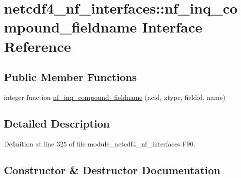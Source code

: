 \hypertarget{interfacenetcdf4__nf__interfaces_1_1nf__inq__compound__fieldname}{}\section{netcdf4\+\_\+nf\+\_\+interfaces\+:\+:nf\+\_\+inq\+\_\+compound\+\_\+fieldname Interface Reference}
\label{interfacenetcdf4__nf__interfaces_1_1nf__inq__compound__fieldname}
\subsection*{Public Member Functions}
\begin{DoxyCompactItemize}
\item 
integer function \hyperlink{interfacenetcdf4__nf__interfaces_1_1nf__inq__compound__fieldname_ae374ea1776beccf5c533842f9eb09b73}{nf\+\_\+inq\+\_\+compound\+\_\+fieldname} (ncid, xtype, fieldid, name)
\end{DoxyCompactItemize}


\subsection{Detailed Description}


Definition at line 325 of file module\+\_\+netcdf4\+\_\+nf\+\_\+interfaces.\+F90.



\subsection{Constructor \& Destructor Documentation}
\mbox{\label{interfacenetcdf4__nf__interfaces_1_1nf__inq__compound__fieldname_ae374ea1776beccf5c533842f9eb09b73}} 
